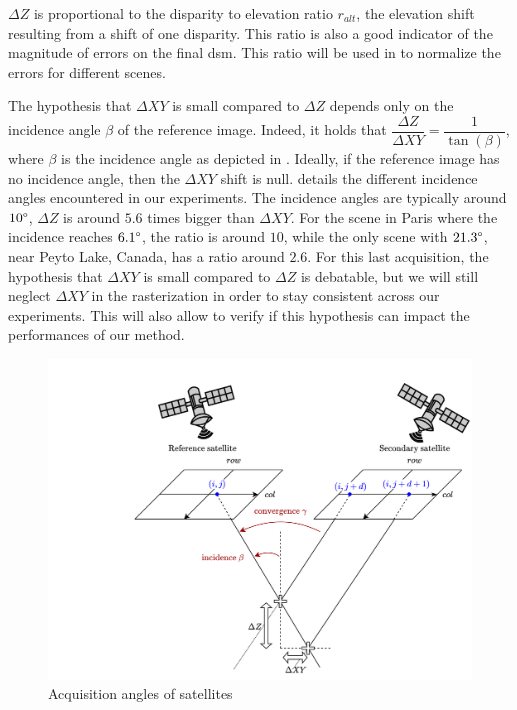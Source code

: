 $\Delta Z$ is proportional to the disparity to elevation ratio $r_{alt}$, \ie the elevation shift resulting from a shift of one disparity. This ratio is also a good indicator of the magnitude of errors on the final \acrshort{dsm}. This ratio will be used in  to normalize the errors for different scenes.
\begin{remark}
     The hypothesis that $\Delta XY$ is small compared to $\Delta Z$ depends only on the incidence angle $\beta$ of the reference image. Indeed, it holds that $\dfrac{\Delta Z}{\Delta XY}=\dfrac{1}{\tan(\beta)}$, where $\beta$ is the incidence angle as depicted in . Ideally, if the reference image has no incidence angle, then the $\Delta XY$ shift is null.  details the different incidence angles encountered in our experiments. The incidence angles are typically around $10\degree$, \ie $\Delta Z$ is around $5.6$ times bigger than $\Delta XY$. For the scene in Paris where the incidence reaches $6.1\degree$, the ratio is around $10$, while the only scene with $21.3\degree$, near Peyto Lake, Canada, has a ratio around $2.6$. For this last acquisition, the hypothesis that $\Delta XY$ is small compared to $\Delta Z$ is debatable, but we will still neglect $\Delta XY$ in the rasterization in order to stay consistent across our experiments. This will also allow to verify if this hypothesis can impact the performances of our method.
\end{remark}

\begin{figure}
    \centering
    \includegraphics[width=0.8\linewidth]{Images/Chap_6/Incidence_angle.png}
    \caption{Acquisition angles of satellites}
    \label{fig:incidence_angle}
\end{figure}

